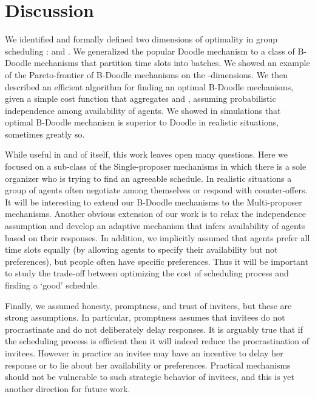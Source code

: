 \section{Discussion} \label{bdoodle:sec:Discussion}

We identified and formally defined two dimensions of optimality in
group scheduling : \Times and \Inconvenience. We generalized the popular
Doodle mechanism to a class of B-Doodle mechanisms that partition time
slots into batches. We showed an example of the Pareto-frontier of
B-Doodle mechanisms on the \Time-\Inconveniences dimensions. We then
described an efficient algorithm for finding an optimal B-Doodle
mechanisms, given a simple cost function that aggregates \Times and
\Inconvenience, assuming probabilistic independence among availability 
of agents. We showed in simulations that optimal B-Doodle mechanism 
is superior to Doodle in realistic situations, sometimes greatly so.

While useful in and of itself, this work leaves open many questions.
Here we focused on a sub-class of the Single-proposer mechanisms in
which there is a sole organizer who is trying to find an agreeable
schedule. In realistic situations a group of agents often negotiate
among themselves or respond with counter-offers. It will be
interesting to extend our B-Doodle mechanisms to the Multi-proposer
mechanisms. Another obvious extension of our work is to relax the
independence assumption and develop an adaptive mechanism that infers
availability of agents based on their responses. In addition, we
implicitly assumed that agents prefer all time slots equally (by
allowing agents to specify their availability but not preferences),
but people often have specific preferences. Thus it will be important
to study the trade-off between optimizing the cost of scheduling
process and finding a `good' schedule.

Finally, we assumed honesty, promptness, and trust of invitees, but
these are strong assumptions. In particular, promptness assumes that
invitees do not procrastinate and do not deliberately delay responses.
It is arguably true that if the scheduling process is efficient then
it will indeed reduce the procrastination of invitees. However in
practice an invitee may have an incentive to delay her response or to
lie about her availability or preferences. Practical mechanisms should
not be vulnerable to such strategic behavior of invitees, and this is
yet another direction for future work.


